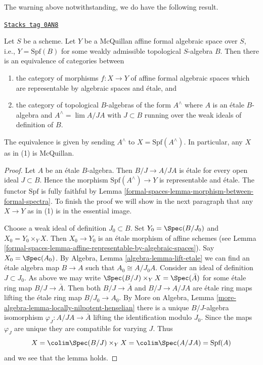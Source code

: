 The warning above notwithstanding, we do have the following result.

\begin{lemma}[Etale]
\label{formal-spaces-lemma-etale}
\href{https://stacks.math.columbia.edu/tag/0AN8}{\texttt{Stacks tag 0AN8}}

Let $S$ be a scheme. Let $Y$ be a McQuillan affine formal algebraic space
over $S$, i.e., $Y = \text{Spf}(B)$ for some weakly admissible topological
$S$-algebra $B$. Then there is an equivalence of categories between
\begin{enumerate}
\item the category of morphisms $f : X \to Y$
of affine formal algebraic spaces which are representable
by algebraic spaces and \'etale, and
\item the category of topological $B$-algebras of the form
$A^\wedge$ where $A$ is an \'etale $B$-algebra and
$A^\wedge = \lim A/JA$ with $J \subset B$ running over the
weak ideals of definition of $B$.
\end{enumerate}
The equivalence is given by sending $A^\wedge$ to  $X = \text{Spf}(A^\wedge)$.
In particular, any $X$ as in (1) is McQuillan.
\end{lemma}

\begin{proof}
Let $A$ be an \'etale $B$-algebra. Then $B/J \to A/JA$ is
\'etale for every open ideal $J \subset B$. Hence
the morphism $\text{Spf}(A^\wedge) \to Y$ is representable and \'etale.
The functor $\text{Spf}$ is fully faithful by
Lemma \ref{formal-spaces-lemma-morphism-between-formal-spectra}.
To finish the proof we will show in the next paragraph
that any $X \to Y$ as in (1) is in the essential image.

\medskip\noindent
Choose a weak ideal of definition $J_0 \subset B$. Set
$Y_0 = \Spec(B/J_0)$ and $X_0 = Y_0 \times_Y X$. Then $X_0 \to Y_0$
is an \'etale morphism of affine schemes (see
Lemma \ref{formal-spaces-lemma-affine-representable-by-algebraic-spaces}).
Say $X_0 = \Spec(A_0)$. By Algebra, Lemma \ref{algebra-lemma-lift-etale}
we can find an \'etale algebra map $B \to A$ such that
$A_0 \cong A/J_0A$. Consider an ideal of definition $J \subset J_0$.
As above we may write $\Spec(B/J) \times_Y X = \Spec(\bar A)$
for some \'etale ring map $B/J \to \bar A$. Then both
$B/J \to \bar A$ and $B/J \to A/JA$ are \'etale ring maps
lifting the \'etale ring map $B/J_0 \to A_0$. By
More on Algebra, Lemma \ref{more-algebra-lemma-locally-nilpotent-henselian}
there is a unique $B/J$-algebra isomorphism
$\varphi_J : A/JA \to \bar A$ lifting the identification modulo $J_0$.
Since the maps $\varphi_J$ are unique they are compatible for varying $J$.
Thus
$$
X = \colim \Spec(B/J) \times_Y X = \colim \Spec(A/JA) = \text{Spf}(A)
$$
and we see that the lemma holds.
\end{proof}

